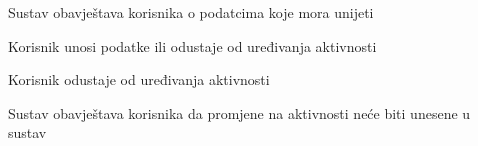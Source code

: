 \begin{packed_item}
\begin{packed_item}
\begin{packed_enum}
								\item Sustav obavještava korisnika o podatcima koje mora unijeti
								\item Korisnik unosi podatke ili odustaje od uređivanja aktivnosti 
								
							\end{packed_enum}
							\item[3.a] Korisnik odustaje od uređivanja aktivnosti
							\item[] \begin{packed_enum}
								
								\item Sustav obavještava korisnika da promjene na aktivnosti neće biti unesene u sustav
								
							\end{packed_enum}
							
						\end{packed_item}
					\end{packed_item}
				
